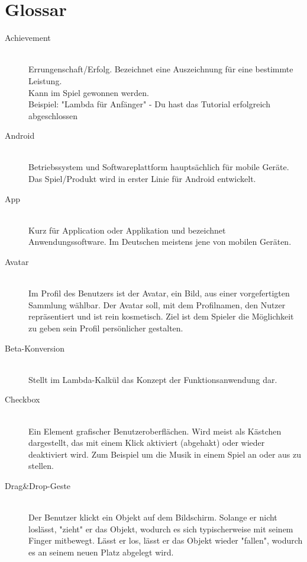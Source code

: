\section{Glossar}

\begin{description}
	\item[Achievement] \hfill \\
	Errungenschaft/Erfolg. Bezeichnet eine Auszeichnung für eine bestimmte Leistung.\\
	Kann im Spiel gewonnen werden.\\
	Beispiel: "Lambda für Anfänger" - Du hast das Tutorial erfolgreich abgeschlossen
	
	\item[Android] \hfill \\
	Betriebssystem und Softwareplattform hauptsächlich für mobile Geräte. Das Spiel/Produkt wird in erster Linie 
	für Android entwickelt.
	
	\item[App] \hfill \\
	Kurz für Application oder Applikation und bezeichnet Anwendungssoftware. Im Deutschen meistens jene von mobilen Geräten.
	
	\item[Avatar] \hfill \\
	Im Profil des Benutzers ist der Avatar, ein Bild, aus einer vorgefertigten Sammlung wählbar.
	Der Avatar soll, mit dem Profilnamen, den Nutzer repräsentiert und ist rein kosmetisch.
	Ziel ist dem Spieler die Möglichkeit zu geben sein Profil persönlicher gestalten.
	
	\item[Beta-Konversion] \hfill \\
	Stellt im Lambda-Kalkül das Konzept der Funktionsanwendung dar.
	
	\item[Checkbox] \hfill \\
	Ein Element grafischer Benutzeroberflächen. Wird meist als Kästchen dargestellt, das mit einem Klick aktiviert (abgehakt) oder
	wieder deaktiviert wird. Zum Beispiel um die Musik in einem Spiel an oder aus zu stellen.
	
	\item[Drag\&Drop-Geste] \hfill \\
	Der Benutzer klickt ein Objekt auf dem Bildschirm. Solange er nicht loslässt, "zieht" er das Objekt, wodurch
	es sich typischerweise mit seinem Finger mitbewegt. Lässt er los, lässt er das Objekt wieder "fallen", wodurch
	es an seinem neuen Platz abgelegt wird.
	

\end{description}
